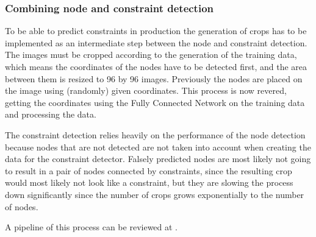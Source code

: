 \subsubsection{Combining node and constraint detection} \label{ch:combine_node_constraint_detection}

To be able to predict constraints in production the generation of crops has to be implemented as an intermediate step between the node and constraint detection.
The images must be cropped according to the generation of the training data, which means the coordinates of the nodes have to be detected first, and the area between them is resized to 96 by 96 images.
Previously the nodes are placed on the image using (randomly) given coordinates.
This process is now revered, getting the coordinates using the Fully Connected Network on the training data and processing the data.

The constraint detection relies heavily on the performance of the node detection because nodes that are not detected are not taken into account when creating the data for the constraint detector.
Falsely predicted nodes are most likely not going to result in a pair of nodes connected by constraints, since the resulting crop would most likely not look like a constraint, but they are slowing the process down significantly since the number of crops grows exponentially to the number of nodes.

A pipeline of this process can be reviewed at .

